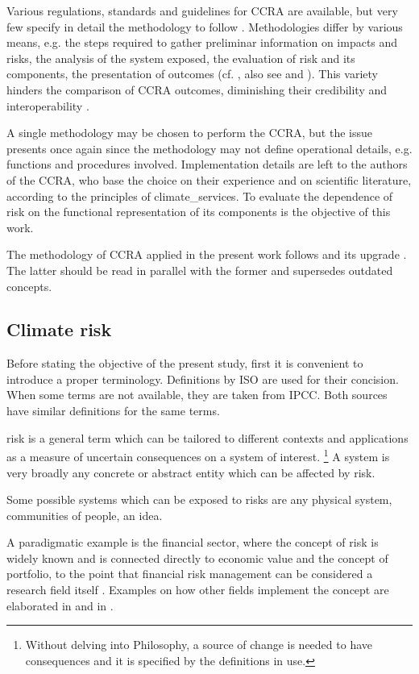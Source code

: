 Various regulations, standards and guidelines for \gls{CCRA} are available, but very few specify in detail the methodology to follow \cite{2024LoyerInventoryOf}. Methodologies differ by various means, e.g. the steps required to gather preliminar information on impacts and risks, the analysis of the system exposed, the evaluation of risk and its components, the presentation of outcomes (cf. \cite{2021ISO14091,2024EEAExecutiveSummary,2017GIZTheVulnerability,2014BowyerAdaptingTo,2024EU20212139}, also see \cite[10-11]{2024LoyerInventoryOf} and \cite[9]{2017GIZRiskSupplement}). This variety hinders the comparison of \gls{CCRA} outcomes, diminishing their credibility and interoperability \cite{2022HainLetsGet}.

A single methodology may be chosen to perform the \gls{CCRA}, but the issue presents once again since the methodology may not define operational details, e.g. functions and procedures involved. Implementation details are left to the authors of the \gls{CCRA}, who base the choice on their experience and on scientific literature, according to the principles of \glspl{climate_service}.
To evaluate the dependence of \gls{risk} on the functional representation of its components is the objective of this work.

The methodology of \gls{CCRA} applied in the present work follows \cite{2017GIZTheVulnerability} and its upgrade \cite{2017GIZRiskSupplement}. The latter should be read in parallel with the former and supersedes outdated concepts.



\subsection{Climate risk}
\label{sec:Climate risk}
Before stating the objective of the present study, first it is convenient to introduce a proper terminology.
Definitions by \gls{ISO} are used for their concision. When some terms are not available, they are taken from \gls{IPCC}. Both sources have similar definitions for the same terms.

\Gls{risk} is a general term which can be tailored to different contexts and applications as a measure of uncertain consequences on a system of interest.%
\footnote{Without delving into Philosophy, a source of change is needed to have consequences and it is specified by the definitions in use.}
A system is very broadly any concrete or abstract entity which can be affected by \gls{risk}.
\begin{example}
  Some possible systems which can be exposed to \glspl{risk} are any physical system, communities of people, an idea.
\end{example}
A paradigmatic example is the financial sector, where the concept of \gls{risk} is widely known and is connected directly to economic value and the concept of portfolio, to the point that financial risk management can be considered a research field itself \cite{2004ChristoffersenElementsOf}.
Examples on how other fields implement the concept are elaborated in \cite[14]{2017GIZRiskSupplement} and in \cite{2020ReisingerTheConcept}.


